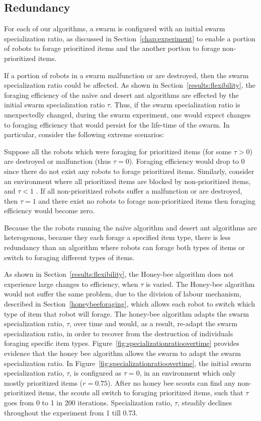 \subsection{Redundancy}
\label{results:redundancy}
For each of our algorithms, a swarm is configured with an initial swarm specialization ratio, as discussed in Section~\ref{chap:experiment} to enable a portion of robots to forage prioritized items and the another portion to forage non-prioritized items. 

If a portion of robots in a swarm malfunction or are destroyed, then the swarm specialization ratio could be affected. As shown in Section~\ref{results:flexibility}, the foraging efficiency of the na\"ive and desert ant algorithms are effected by the initial swarm specialization ratio $\tau$. Thus, if the swarm specialization ratio is unexpectedly changed, during the swarm experiment, one would expect changes to foraging efficiency that would persist for the life-time of the swarm. In particular, consider the following extreme scenarios: 

Suppose all the robots which were foraging for prioritized items (for some $\tau > 0$) are destroyed or malfunction (thus $\tau=0$). Foraging efficiency would drop to 0 since there do not exist any robots to forage prioritized items. Similarly, consider an environment where all prioritized items are blocked by non-prioritized items, and $\tau < 1$ . If all non-prioritized robots suffer a malfunction or are destroyed, then $\tau=1$ and there exist no robots to forage non-prioritized items then foraging efficiency would become zero. 

Because the the robots running the na\"ive algorithm and desert ant algorithms are heterogenous, because they each forage a specified item type, there is less redundancy than an algorithm where robots can forage both types of items or switch to foraging different types of items.

As shown in Section~\ref{results:flexibility}, the Honey-bee algorithm does not experience large changes to efficiency, when $\tau$ is varied. The Honey-bee algorithm would not suffer the same problem, due to the division of labour mechanism, described in Section~\ref{honeybeeforaging}, which allows each robot to switch which type of item that robot will forage. The honey-bee algorithm adapts the swarm specialization ratio, $\tau$, over time and would, as a result, re-adapt the swarm specialization ratio, in order to recover from the destruction of individuals foraging specific item types. Figure~\ref{fig:specializationratioovertime} provides evidence that the honey bee algorithm allows the swarm to adapt the swarm specialization ratio. In Figure~\ref{fig:specializationratioovertime}, the initial swarm specialization ratio, $\tau$, is configured as $\tau=0$, in an environment which only mostly prioritized items ($r=0.75$). After no honey bee scouts can find any non-prioritized items, the scouts all switch to foraging prioritized items, such that $\tau$ goes from 0 to 1 in 200 iterations. Specialization ratio, $\tau$, steadily declines throughout the experiment from 1 till 0.73.

